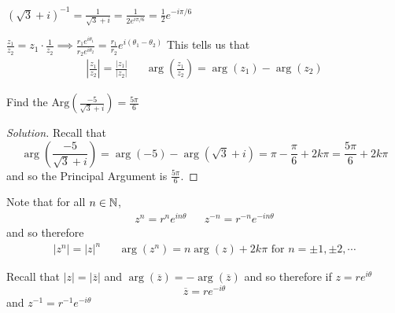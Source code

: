\documentclass[12pt]{scrartcl}
\begin{document}
\begin{example}
  $(\sqrt{3} + i)^{-1} = \frac{1}{\sqrt{3} + i} = \frac{1}{2e^{i\pi / 6}} = \frac{1}{2}e^{-i\pi / 6}$
\end{example}

\begin{definition}[Fractions]
  $\frac{z_1}{z_2} = z_1 \cdot \frac{1}{z_2} \implies \frac{r_1e^{i\theta_1}}{r_2e^{i\theta_2}} = \frac{r_1}{r_2}e^{i(\theta_1 - \theta_2)}$
  This tells us that 
  \begin{align*}
    |\frac{z_1}{z_2}| = \frac{|z_1|}{|z_2|} && \arg(\frac{z_1}{z_2}) = \arg(z_1) - \arg(z_2)
  \end{align*}
\end{definition}

\begin{example}
  Find the $\text{Arg}(\frac{-5}{\sqrt{3} + i}) = \frac{5\pi}{6}$

  \begin{proof}[Solution]
    Recall that 
    \[\arg(\frac{-5}{\sqrt{3} + i}) = \arg(-5) - \arg(\sqrt{3} + i) = \pi - \frac{\pi}{6} + 2k\pi = \frac{5\pi}{6} + 2k\pi\]
    and so the Principal Argument is $\frac{5\pi}{6}$.
  \end{proof}
\end{example}

\begin{note}
  Note that for all $n \in \mathbb N$, 
  \begin{align*}
    z^n = r^n e^{in\theta} && z^{-n} = r^{-n}e^{-in\theta}
  \end{align*}
  and so therefore 
  \begin{align*}
    |z^n| = |z|^n && \arg(z^n) = n\arg(z) + 2k\pi \text{ for } n = \pm 1, \pm 2, \cdots
  \end{align*}
\end{note}

\begin{definition}
  Recall that $|z| = |\overline{z}|$ and $\arg(\overline{z}) = -\arg(\overline{z})$ and so therefore if $z = re^{i\theta}$
  \[\overline{z} = re^{-i\theta}\]
  and $z^{-1} = r^{-1}e^{-i\theta}$
\end{definition}
\end{document}
